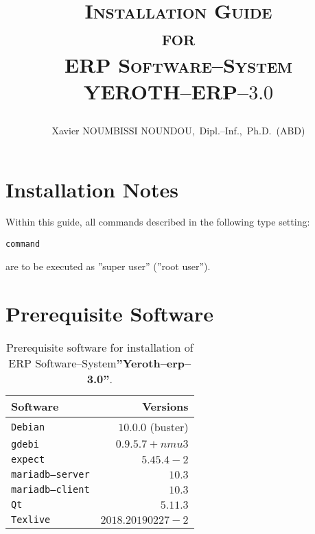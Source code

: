 \documentclass[a4paper, 10pt]{article}
\newcommand{\yerotherptroiszero}{\textbf{''Yeroth--erp--3.0''}\xspace}
\newcommand{\texlive}{\texttt{Texlive}\xspace}
\newcommand{\gdebi}{\texttt{gdebi}\xspace}
\newcommand{\expect}{\texttt{expect}\xspace}
\newcommand{\debian}{\texttt{Debian}\xspace}
\newcommand{\qt}{\texttt{Qt}\xspace}
\newcommand{\mariadbserver}{\texttt{mariadb--server}\xspace}
\newcommand{\mariadbclient}{\texttt{mariadb--client}\xspace}
\newcommand{\yerotherp}{\textcolor{yerenColorBlue}{\sc YEROTH--ERP--$3.0$}\xspace}
\newcommand{\erp}{ERP Software--System\xspace}
\newcommand{\myfullacademicname}{Xavier NOUMBISSI NOUNDOU,~Dipl.--Inf.,~Ph.D.~(ABD)\xspace}
\newcommand{\rootcommand}[1]{\textcolor{purplish}{#1\xspace}}
\begin{document}

\title{
\vspace{-1.65em}
\textcolor{medgreen}{\textsc{Installation Guide\\
										for \\
									 \erp \\ \vspace{1em}
									 \yerotherp}}
									 \author{\myfullacademicname}
}

\date{} 
\maketitle
\thispagestyle{fancy}


\vspace{0.25cm}

\section{Installation Notes}

Within this guide, all commands described
in the following type setting:
	\begin{alltt}
		\rootcommand{command}
	\end{alltt}
are to be executed as ''super user'' (''root user'').

\section{Prerequisite Software}

\begin{table}[!htbp]
\centering
\begin{tabular}{l|r}
\textbf{Software}	&
\textbf{Versions}	\\ \hline
\debian				&
$10.0.0$ (buster)	\\ \hline
\gdebi				&
$0.9.5.7+nmu3$		\\ \hline
\expect				&
$5.45.4-2$			\\ \hline
\mariadbserver		&
$10.3$				\\ \hline
\mariadbclient		&
$10.3$				\\ \hline
\qt					&
$5.11.3$			\\ \hline	
\texlive			&
$2018.20190227-2$	\\
\end{tabular}
\caption{Prerequisite software for installation of
	 \erp \yerotherptroiszero.}
\label{tab:prerequisite-software}
\end{table}
\end{document}

